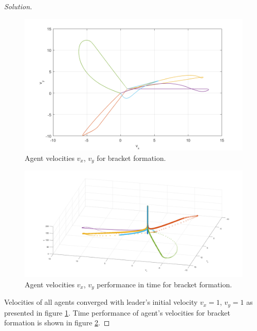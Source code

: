 \documentclass[12pt]{article}
\newenvironment{solution}{\begin{proof}[Solution]}{\end{proof}}
\begin{document}
\begin{solution}
\begin{figure}[!h]
	\includegraphics[scale=0.41]{figures/BracketVelocities2D.png}
	\centering
	\caption{Agent velocities $v_x$, $v_y$ for bracket formation.}
	\label{bracketVel}
\end{figure}
\begin{figure}[!t]
	\includegraphics[scale=0.34]{figures/BracketVelocities3D.png}
	\centering
	\caption{Agent velocities $v_x$, $v_y$ performance in time for bracket formation.}
	\label{bracketVel_3D}
\end{figure} 
Velocities of all agents converged with leader's initial velocity $v_x=1$, $v_y=1$ as presented in figure \ref{bracketVel}. Time performance of agent's velocities for bracket formation is shown in figure \ref{bracketVel_3D}.

\end{solution}
\end{document}
